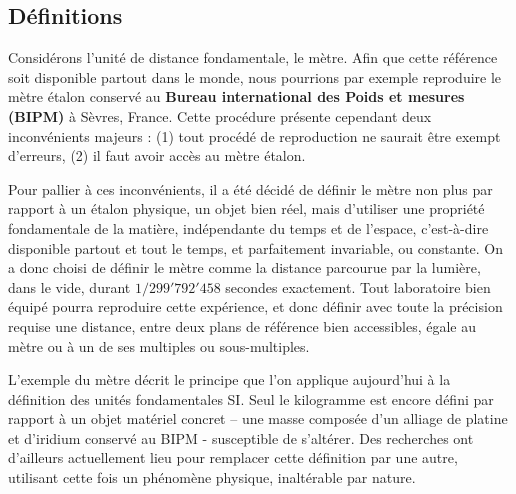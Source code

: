 \subsection{Définitions}

Considérons l'unité de distance fondamentale, le mètre. Afin que cette référence soit disponible partout dans le monde, nous pourrions par exemple reproduire le mètre étalon conservé au \textbf{Bureau international des Poids et mesures (BIPM)} à Sèvres, France. Cette procédure présente cependant deux inconvénients majeurs : (1) tout procédé de reproduction ne saurait être exempt d'erreurs, (2) il faut avoir accès au mètre étalon.

Pour pallier à ces inconvénients, il a été décidé de définir le mètre non plus par rapport à un étalon physique, un objet bien réel, mais d'utiliser une propriété fondamentale de la matière, indépendante du temps et de l'espace, c'est-à-dire disponible partout et tout le temps, et parfaitement invariable, ou constante. On a donc choisi de définir le mètre comme la distance parcourue par la lumière, dans le vide, durant $1/299'792'458$ secondes exactement. Tout laboratoire bien équipé pourra reproduire cette expérience, et donc définir avec toute la précision requise une distance, entre deux plans de référence bien accessibles, égale au mètre ou à un de ses multiples ou sous-multiples.

L'exemple du mètre décrit le principe que l'on applique aujourd'hui à la définition des unités fondamentales SI. Seul le kilogramme est encore défini par rapport à un objet matériel concret – une masse composée d'un alliage de platine et d'iridium conservé au BIPM - susceptible de s'altérer. Des recherches ont d'ailleurs actuellement lieu pour remplacer cette définition par une autre, utilisant cette fois un phénomène physique, inaltérable par nature.

\newpage

